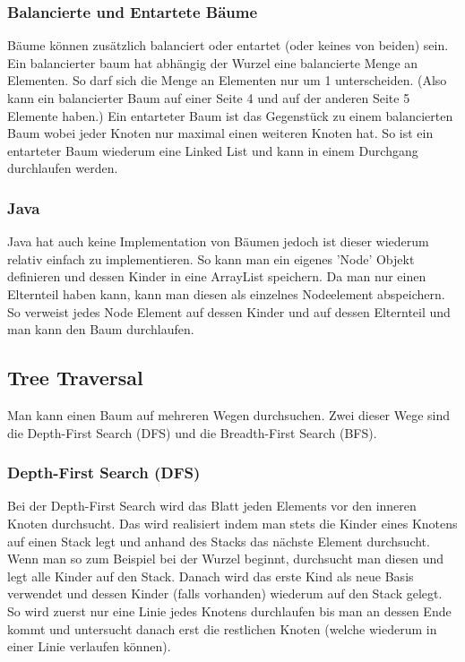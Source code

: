 \documentclass{article}
\begin{document}
	\subsubsection{Balancierte und Entartete Bäume}
	Bäume können zusätzlich balanciert oder entartet (oder keines von beiden) sein. Ein balancierter baum hat abhängig der Wurzel eine balancierte Menge an Elementen. So darf sich die Menge an Elementen nur um 1 unterscheiden. (Also kann ein balancierter Baum auf einer Seite 4 und auf der anderen Seite 5 Elemente haben.) Ein entarteter Baum ist das Gegenstück zu einem balancierten Baum wobei jeder Knoten nur maximal einen weiteren Knoten hat. So ist ein entarteter Baum wiederum eine Linked List und kann in einem Durchgang durchlaufen werden.
	\subsubsection{Java}
	Java hat auch keine Implementation von Bäumen jedoch ist dieser wiederum relativ einfach zu implementieren. So kann man ein eigenes 'Node' Objekt definieren und dessen Kinder in eine ArrayList speichern. Da man nur einen Elternteil haben kann, kann man diesen als einzelnes Nodeelement abspeichern. So verweist jedes Node Element auf dessen Kinder und auf dessen Elternteil und man kann den Baum durchlaufen.
	\subsection{Tree Traversal}
	Man kann einen Baum auf mehreren Wegen durchsuchen. Zwei dieser Wege sind die Depth-First Search (DFS) und die Breadth-First Search (BFS).
	\subsubsection{Depth-First Search (DFS)}
	Bei der Depth-First Search wird das Blatt jeden Elements vor den inneren Knoten durchsucht. Das wird realisiert indem man stets die Kinder eines Knotens auf einen Stack legt und anhand des Stacks das nächste Element durchsucht. Wenn man so zum Beispiel bei der Wurzel beginnt, durchsucht man diesen und legt alle Kinder auf den Stack. Danach wird das erste Kind als neue Basis verwendet und dessen Kinder (falls vorhanden) wiederum auf den Stack gelegt. So wird zuerst nur eine Linie jedes Knotens durchlaufen bis man an dessen Ende kommt und untersucht danach erst die restlichen Knoten (welche wiederum in einer Linie verlaufen können).
	



	
	
	
	























	
\end{document}
